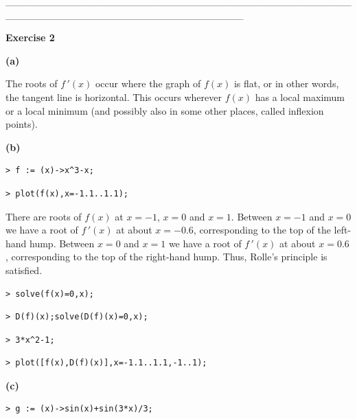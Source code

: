 \documentclass{article}
\begin{document}
\begin{Maple Normal}
\_\_\_\_\_\_\_\_\_\_\_\_\_\_\_\_\_\_\_\_\_\_\_\_\_\_\_\_\_\_\_\_\_\_\_\_\_\_\_\_\_\_\_\_\_\_\_\_\_\_\_\_\_\_\_\_\_\_\_\_\_\_\_\_\_\_\_\_\_\_\_\_\_\_\_\_\_\_\_\_\_
\end{Maple Normal}
\begin{Maple Normal}
\textbf{Exercise 2}
\end{Maple Normal}
\begin{Maple Normal}
\textbf{(a)}
\end{Maple Normal}
\begin{Maple Normal}
The roots of 
$\mathit{f\,'} (x)$ occur where the graph of 
$f (x)$ is flat, or in other words, the tangent line is horizontal.  This occurs wherever 
$f (x)$ has a local maximum or a local minimum (and possibly also in some other places, called inflexion points).
\end{Maple Normal}
\begin{Maple Normal}
\textbf{(b)}
\end{Maple Normal}
\begin{lstlisting}
> f := (x)->x^3-x;
\end{lstlisting}
\begin{lstlisting}
> plot(f(x),x=-1.1..1.1);
\end{lstlisting}
\begin{Maple Normal}
There are roots of 
$f (x)$ at 
$x =-1$, 
$x =0$ and 
$x =1$.  Between 
$x =-1$ and 
$x =0$ we have a root of 
$\mathit{f\,'} (x)$ at about 
$x =- 0.6$, corresponding to the top of the left-hand hump.  Between 
$x =0$ and 
$x =1$ we have a root of 
$\mathit{f\,'} (x)$ at about 
$x = 0.6$, corresponding to the top of the right-hand hump.  Thus, Rolle's principle is satisfied.
\end{Maple Normal}
\begin{lstlisting}
> solve(f(x)=0,x);
\end{lstlisting}
\begin{lstlisting}
> D(f)(x);solve(D(f)(x)=0,x);
\end{lstlisting}
\begin{lstlisting}
> 3*x^2-1;
\end{lstlisting}
\begin{lstlisting}
> plot([f(x),D(f)(x)],x=-1.1..1.1,-1..1);
\end{lstlisting}
\begin{Maple Normal}
\textbf{(c)}
\end{Maple Normal}
\begin{lstlisting}
> g := (x)->sin(x)+sin(3*x)/3;
\end{lstlisting}
\end{document}

